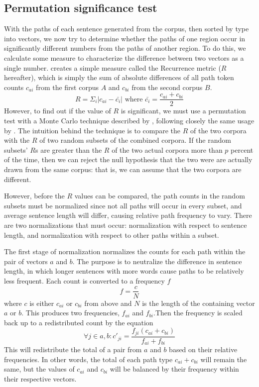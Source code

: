 \documentclass[11pt]{article}
\begin{document}
\subsection{Permutation significance test}

With the paths of each sentence generated from the corpus, then sorted
by type into vectors, we now try to determine
whether the paths of one region occur in significantly different
numbers from the paths of another region. To do this, we calculate some
measure to characterize the difference between two vectors as a single
number. \cite{kessler01} creates a simple measure called the
{\sc Recurrence} metric ($R$ hereafter), which
is simply the sum of absolute differences of all path token counts
$c_{ai}$ from the first corpus $A$ and $c_{bi}$ from the second corpus
$B$.
\[ R = \Sigma_i |c_{ai} - \bar{c_i}| \textrm{ where } \bar{c_i} = \frac{c_{ai} + c_{bi}}{2}\]
However, to find out if the value of $R$ is significant, we
must use a permutation test with a Monte Carlo technique described by
\cite{good95}, following
closely the same usage by \cite{nerbonne06}. The intuition behind
the technique is to compare the $R$ of the two corpora with the $R$ of
two random subsets of the combined corpora. If the random subsets' $R$s
are greater than the $R$ of the two actual corpora more than $p$ percent
of the time, then we can reject the null hypothesis that the two were
are actually drawn from the same corpus: that is, we can assume that
the two corpora are different.

However, before the $R$ values can be compared, the path counts in the
random subsets must
be normalized since not all paths will occur in every subset, and
average sentence length will differ, causing relative path frequency
to vary. There are two normalizations that must occur: normalization
with respect to sentence length, and
normalization with respect to other paths within a subset.

The first stage of normalization normalizes the counts for each path
within the pair of vectors $a$ and $b$. The purpose is to neutralize the
difference in sentence length, in which longer sentences with more
words cause paths to be relatively less frequent.
Each count is converted to a frequency $f$ \[f=\frac{c}{N} \] where
$c$ is either $c_{ai}$ or $c_{bi}$ from above and $N$ is the length of the
containing vector $a$ or $b$. This produces two frequencies, $f_{ai}$ and
$f_{bi}$.Then the frequency is scaled
back up to a redistributed count by the equation
\[\forall j \in a,b : c'_{ji} = \frac{f_{ji}(c_{ai}+c_{bi})}{f_{ai}+f_{bi}}\]
This will redistribute the total of a pair from $a$ and $b$ based on
their relative frequencies. In other words, the total of each path
type $c_{ai} + c_{bi}$ will remain the same, but the values of
$c_{ai}$ and $c_{bi}$ will be balanced by their frequency
within their respective vectors.
\end{document}
